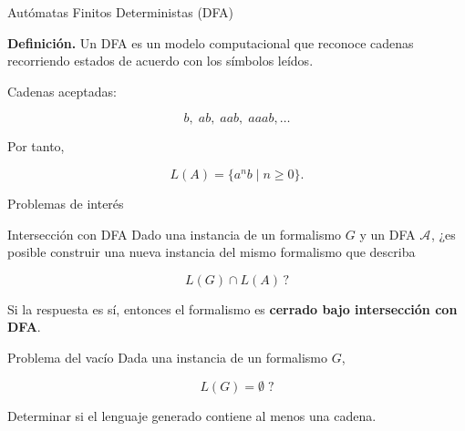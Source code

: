 \documentclass{beamer}
\newcommand{\aut}[1]{\mathcal{A}_{#1}}
\begin{document}
\begin{frame}{Autómatas Finitos Deterministas (DFA)}

    \pause

    \textbf{Definición.}
    Un DFA es un modelo computacional que reconoce cadenas recorriendo estados de acuerdo con los símbolos leídos.

    \pause

    \vspace{0.5cm}

    \begin{center}
    \end{center}

    \pause

    Cadenas aceptadas:

    \[
        b,\; ab,\; aab,\; aaab,\ldots
    \]

    \pause

    Por tanto,

    \[
        L(A)=\{a^n b \mid n\geq 0\}.
    \]

\end{frame}

\begin{frame}{Problemas de interés}

    \pause

    \begin{block}{Intersección con DFA}
        Dado una instancia de un formalismo $G$ y un DFA $\aut{}$,
        ¿es posible construir una nueva instancia del mismo formalismo que describa

        \[
            L(G)\cap L(A)\,?
        \]

        \pause

        Si la respuesta es sí, entonces el formalismo es
        \textbf{cerrado bajo intersección con DFA}.
    \end{block}

    \pause

    \begin{block}{Problema del vacío}
        Dada una instancia de un formalismo $G$,

        \[
            L(G)=\emptyset\;?
        \]

        \pause

        Determinar si el lenguaje generado contiene al menos una cadena.
    \end{block}

\end{frame}
\end{document}
